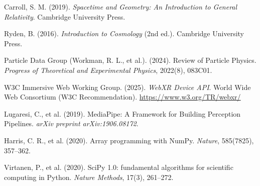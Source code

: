 \begin{enumerate}[label={[\arabic*]}, leftmargin=2.5em, itemsep=7pt]
    \item Carroll, S. M. (2019). \textit{Spacetime and Geometry: An Introduction to General Relativity}. Cambridge University Press.
    \item Ryden, B. (2016). \textit{Introduction to Cosmology} (2nd ed.). Cambridge University Press.
    \item Particle Data Group (Workman, R. L., et al.). (2024). Review of Particle Physics. \textit{Progress of Theoretical and Experimental Physics}, 2022(8), 083C01.
    \item W3C Immersive Web Working Group. (2025). \textit{WebXR Device API}. World Wide Web Consortium (W3C Recommendation). \url{https://www.w3.org/TR/webxr/}
    \item Lugaresi, C., et al. (2019). MediaPipe: A Framework for Building Perception Pipelines. \textit{arXiv preprint arXiv:1906.08172}.
    \item Harris, C. R., et al. (2020). Array programming with NumPy. \textit{Nature}, 585(7825), 357--362.
    \item Virtanen, P., et al. (2020). SciPy 1.0: fundamental algorithms for scientific computing in Python. \textit{Nature Methods}, 17(3), 261--272.
\end{enumerate}

